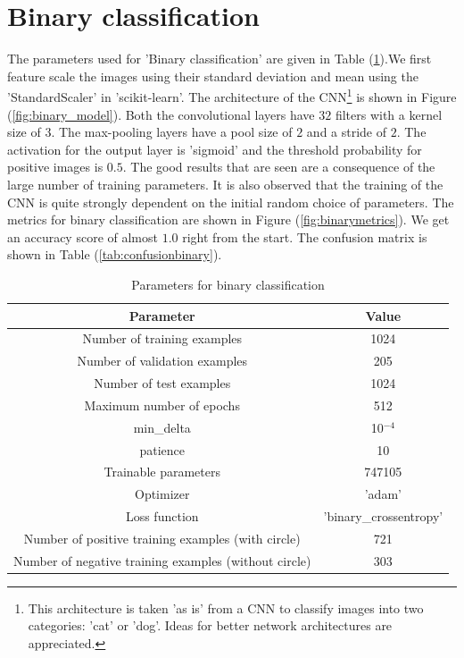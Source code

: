 \documentclass{article}
\begin{document}
\section{Binary classification}
 The parameters used for 'Binary classification' are given in Table (\ref{tab:binaryparam}).We first feature scale the images using their standard deviation and mean using the 'StandardScaler' in 'scikit-learn'. The architecture of the CNN\footnote{This architecture is taken 'as is' from a CNN to classify images into two categories: 'cat' or 'dog'. Ideas for better network architectures are appreciated.} is shown in Figure (\ref{fig:binary_model}). Both the convolutional layers have $32$ filters with a kernel size of $3$. The max-pooling layers have a pool size of $2$ and a stride of $2$. The activation for the output layer is 'sigmoid' and the threshold probability for positive images is $0.5$. The good results that are seen are a consequence of the large number of training parameters. It is also observed that the training of the CNN is quite strongly dependent on the initial random choice of parameters. The metrics for binary classification are shown in Figure (\ref{fig:binarymetrics}). We get an accuracy score of almost $1.0$ right from the start. The confusion matrix is shown in Table (\ref{tab:confusionbinary}). 
\begin{table}
  \centering
  \begin{tabular}{|c|c|}
    \hline
    Parameter & Value \\
    \hline
    Number of training examples   & 1024 \\
    Number of validation examples & 205 \\
    Number of test examples       & 1024 \\
    Maximum number of epochs      & 512 \\
    min{\_}delta      & 10$^{-4}$\\
    patience                      & 10  \\
    Trainable parameters          & 747105\\
    Optimizer         & 'adam'     \\
    Loss function     & 'binary\_crossentropy' \\
    Number of positive training examples (with circle) & 721\\
    Number of negative training examples (without circle) & 303\\
    \hline
  \end{tabular}
  \caption{\label{tab:binaryparam} Parameters for binary classification}
\end{table}
\end{document}

